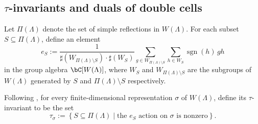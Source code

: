 \documentclass[12pt]{amsart}
\def\subset{\subseteq}
\newcommand{\CC}{{\mathcal {C}}}
\newcommand{\CH}{{\mathcal {H}}}
\newcommand{\CO}{{\mathcal {O}}}
\newcommand{\sgn}{\operatorname{sgn}}
\newcommand{\oS}{\operatorname{S}}
\newcommand{\g}{\mathfrak g}
\newcommand{\h}{\mathfrak h}
\renewcommand{\c}{\mathfrak c}
\numberwithin{equation}{section}
\theoremstyle{remark}
\def\Irrsp{\mathrm{Irr}^{\mathrm{sp}}}
\def\hha{{}^a\fhh}
\begin{document}










\subsection{$\tau$-invariants and duals of double cells}\label{subsec:tau-DC}

Let $\Pi(\Lambda)$ denote the set of simple reflections in $W(\Lambda)$.
For each subset $S\subset \Pi(\Lambda)$, define an element
\[
e_S :=\frac{1}{\sharp(W_{\Pi(\Lambda)\setminus S})\cdot \sharp(W_S)}\sum_{g\in W_{\Pi(\Lambda)\setminus S}}\sum_{h\in W_{S}} \sgn(h) \,  gh
\]
in the group algebra $\bC[W(\Lambda)]$, where $W_S$ and $W_{\Pi(\Lambda)\setminus S}$ are the subgroups of $W(\Lambda)$ generated by $S$ and $\Pi(\Lambda)\setminus S$ respectively.

Following \cite{FJMN}, for every finite-dimensional representation $\sigma$ of $W(\Lambda)$,  %
define its $\tau$-invariant to be the set
\[
  \tau_\sigma:=\left\{S\subset \Pi(\Lambda)\mid
   \text{the $e_S$ action on $\sigma$ is nonzero}
  \right\}.
\]
\end{document}
